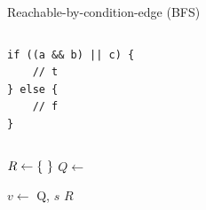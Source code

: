 \documentclass[xcolor = {dvipsnames, table}]{beamer}
\begin{document}
\newcommand{\includegraph}[2]{%
    \includegraphics<#1>[
        width  = \linewidth,
        height = \textheight,
        keepaspectratio,
    ]{graph/#2.pdf}
}

\begin{frame}
    Reachable-by-condition-edge (BFS)
\end{frame}

\begin{frame}[fragile]
    \begin{columns}
        \begin{column}{0.4\textwidth}
            \begin{lstlisting}[basicstyle = \footnotesize\ttfamily]
if ((a && b) || c) {
    // t
} else {
    // f
}
            \end{lstlisting}
        \end{column}

    \end{columns}
\end{frame}

\begin{frame}
    \begin{algorithmic}[1]
            \State $R \gets \set{}$
            \State $Q \gets$ 

            \Repeat
                \State $v \gets$ 
                    \State {} {Q, $s$}
                    \State {}
                \EndFor
            \State \Return $R$
        \EndFunction
    \end{algorithmic}
\end{frame}
\end{document}
